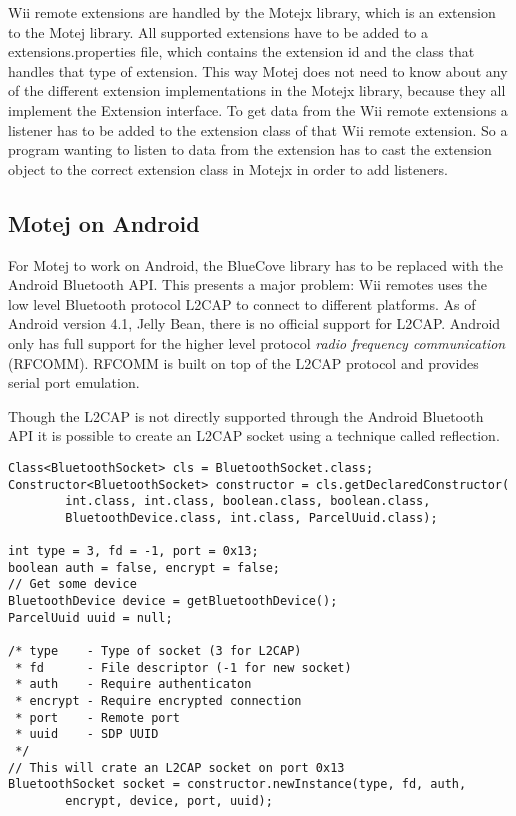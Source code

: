 Wii remote extensions are handled by the Motejx library, which is an extension to the Motej library. All supported extensions have to be added to a extensions.properties file, which contains the extension id and the class that handles that type of extension. This way Motej does not need to know about any of the different extension implementations in the Motejx library, because they all implement the Extension interface. To get data from the Wii remote extensions a listener has to be added to the extension class of that Wii remote extension. So a program wanting to listen to data from the extension has to cast the extension object to the correct extension class in Motejx in order to add listeners.


\subsection{Motej on Android}
For Motej to work on Android, the BlueCove library has to be replaced with the Android Bluetooth API. This presents a major problem: Wii remotes uses the low level Bluetooth protocol L2CAP to connect to different platforms. As of Android version 4.1, Jelly Bean, \cite{jellyBean} there is no official support for L2CAP. Android only has full support for the higher level protocol \emph{radio frequency communication} (RFCOMM). RFCOMM is built on top of the L2CAP protocol and provides serial port emulation. 

Though the L2CAP is not directly supported through the Android Bluetooth API it is possible to create an L2CAP socket using a technique called reflection.

\begin{lstlisting}
Class<BluetoothSocket> cls = BluetoothSocket.class;
Constructor<BluetoothSocket> constructor = cls.getDeclaredConstructor(
		int.class, int.class, boolean.class, boolean.class,
		BluetoothDevice.class, int.class, ParcelUuid.class);

int type = 3, fd = -1, port = 0x13;
boolean auth = false, encrypt = false;
// Get some device
BluetoothDevice device = getBluetoothDevice();
ParcelUuid uuid = null;

/* type    - Type of socket (3 for L2CAP)
 * fd      - File descriptor (-1 for new socket)
 * auth    - Require authenticaton
 * encrypt - Require encrypted connection
 * port    - Remote port
 * uuid	   - SDP UUID
 */
// This will crate an L2CAP socket on port 0x13
BluetoothSocket socket = constructor.newInstance(type, fd, auth,
		encrypt, device, port, uuid);
\end{lstlisting}

